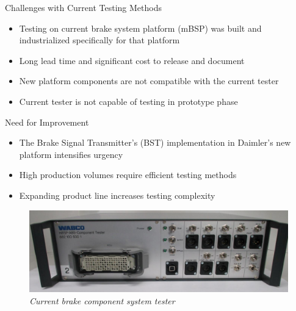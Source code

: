 \documentclass[8pt,compress,aspectratio=169]{beamer}
\begin{document}
\begin{frame}
    \begin{minipage}{0.475\textwidth}
    \begin{block}{Challenges with Current Testing Methods}
        \begin{itemize}
            \small
            \item Testing on current brake system platform (mBSP) was built and industrialized specifically for that platform
            \item Long lead time and significant cost to release and document
            \item New platform components are not compatible with the current tester
            \item Current tester is not capable of testing in prototype phase
        \end{itemize}
    \end{block}
    \begin{block}{Need for Improvement}
      \small
        \begin{itemize}
          \item The Brake Signal Transmitter's (BST) implementation in Daimler's new platform intensifies urgency
            \item High production volumes require efficient testing methods 
            \item Expanding product line increases testing complexity
        \end{itemize}
    \end{block}
    \end{minipage}
    \hfill
    \begin{minipage}{0.475\textwidth}
        \begin{figure}
          \includegraphics[width=\textwidth]{assets/misc/abs-tester.png}
          \caption{\it Current brake component system tester}
        \end{figure}
    \end{minipage}
\end{frame}
\end{document}
